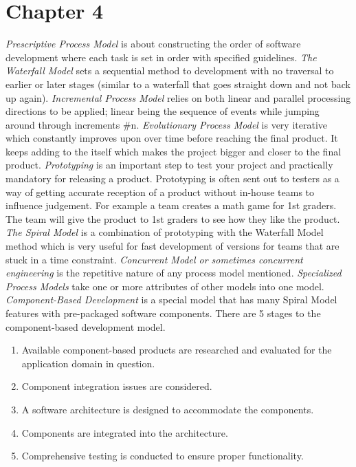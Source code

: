 \documentclass[12pt]{article}
\begin{document}
\section{Chapter 4}
\indent 
\emph{Prescriptive Process Model} is about constructing the order of software development where each task is set in order with specified guidelines. 
\emph{The Waterfall Model} sets a sequential method to development with no traversal to earlier or later stages (similar to a waterfall that goes straight down and not back up again). 
\emph{Incremental Process Model} relies on both linear and parallel processing directions to be applied; linear being the sequence of events while jumping around through increments \#n. 
\emph{Evolutionary Process Model} is very iterative which constantly improves upon over time before reaching the final product. It keeps adding to the itself which makes the project bigger and closer to the final product. 
\emph{Prototyping} is an important step to test your project and practically mandatory for releasing a product. Prototyping is often sent out to testers as a way of getting accurate reception of a product without in-house teams to influence judgement. For example a team creates a math game for 1st graders. The team will give the product to 1st graders to see how they like the product.
\emph{The Spiral Model} is a combination of prototyping with the Waterfall Model method which is very useful for fast development of versions for teams that are stuck in a time constraint.
\emph{Concurrent Model or sometimes concurrent engineering} is the repetitive nature of any process model mentioned.
\emph{Specialized Process Models} take one or more attributes of other models into one model.
\emph{Component-Based Development} is a special model that has many Spiral Model features with pre-packaged software components. There are 5 stages to the component-based development model.
    \begin{enumerate}
        \item Available component-based products are researched and evaluated for 
        the application domain in question.  
        \item Component integration issues are considered.  
        \item A software architecture is designed to accommodate the components.  
        \item Components are integrated into the architecture.
        \item Comprehensive testing is conducted to ensure proper functionality.  
    \end{enumerate}
\end{document}
